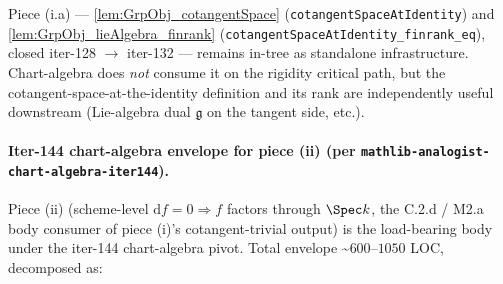 Piece (i.a) --- \cref{lem:GrpObj_cotangentSpace} (\texttt{cotangentSpaceAtIdentity}) and \cref{lem:GrpObj_lieAlgebra_finrank} (\texttt{cotangentSpaceAtIdentity\_finrank\_eq}), closed iter-128 \(\to\) iter-132 --- remains in-tree as standalone infrastructure. Chart-algebra does \emph{not} consume it on the rigidity critical path, but the cotangent-space-at-the-identity definition and its rank are independently useful downstream (Lie-algebra dual \(\mathfrak g\) on the tangent side, etc.).

\paragraph{Iter-144 chart-algebra envelope for piece (ii) (per \texttt{mathlib-analogist-chart-algebra-iter144}).}
Piece (ii) (scheme-level \(\mathrm df = 0 \Rightarrow f\) factors through \(\Spec k\), the C.2.d / M2.a body consumer of piece (i)'s cotangent-trivial output) is the load-bearing body under the iter-144 chart-algebra pivot. Total envelope \textasciitilde\(600\)--\(1050\) LOC, decomposed as:

